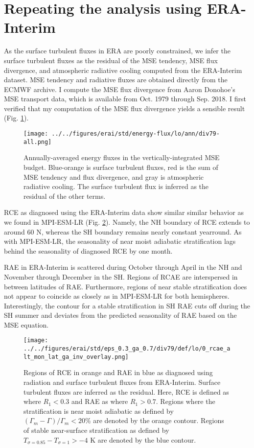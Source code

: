 \documentclass[11pt]{article}
\begin{document}
\section{Repeating the analysis using ERA-Interim}
\label{sec:orgb97cfc7}
As the surface turbulent fluxes in ERA are poorly constrained, we infer the surface turbulent fluxes as the residual of the MSE tendency, MSE flux divergence, and atmospheric radiative cooling computed from the ERA-Interim dataset. MSE tendency and radiative fluxes are obtained directly from the ECMWF archive. I compute the MSE flux divergence from Aaron Donohoe's MSE transport data, which is available from Oct. 1979 through Sep. 2018. I first verified that my computation of the MSE flux divergence yields a sensible result (Fig. \ref{fig:orgaa39c6c}).

\begin{figure}[htbp]
\centering
\texttt{[image: ../../figures/erai/std/energy-flux/lo/ann/div79-all.png]}
\caption{\label{fig:orgaa39c6c}Annually-averaged energy fluxes in the vertically-integrated MSE budget. Blue-orange is surface turbulent fluxes, red is the sum of MSE tendency and flux divergence, and gray is atmospheric radiative cooling. The surface turbulent flux is inferred as the residual of the other terms.}
\end{figure}

RCE as diagnosed using the ERA-Interim data show similar similar behavior as we found in MPI-ESM-LR (Fig. \ref{fig:orgf470bb8}). Namely, the NH boundary of RCE extends to around 60 N, whereas the SH boundary remains nearly constant yearround. As with MPI-ESM-LR, the seasonality of near moist adiabatic stratification lags behind the seasonality of diagnosed RCE by one month.

RAE in ERA-Interim is scattered during October through April in the NH and November through December in the SH. Regions of RCAE are interspersed in between latitudes of RAE. Furthermore, regions of near stable stratification does not appear to coincide as closely as in MPI-ESM-LR for both hemispheres. Interestingly, the contour for a stable stratification in SH RAE cuts off during the SH summer and deviates from the predicted seasonality of RAE based on the MSE equation.

\begin{figure}[htbp]
\centering
\texttt{[image: ../../figures/erai/std/eps\_0.3\_ga\_0.7/div79/def/lo/0\_rcae\_alt\_mon\_lat\_ga\_inv\_overlay.png]}
\caption{\label{fig:orgf470bb8}Regions of RCE in orange and RAE in blue as diagnosed using radiation and surface turbulent fluxes from ERA-Interim. Surface turbulent fluxes are inferred as the residual. Here, RCE is defined as where \(R_1 < 0.3\) and RAE as where \(R_1 > 0.7\). Regions where the stratification is near moist adiabatic as defined by \((\Gamma_m-\Gamma)/\Gamma_m<20\%\) are denoted by the orange contour. Regions of stable near-surface stratification as defined by \(T_{\sigma=0.85}-T_{\sigma=1}>-4\) K are denoted by the blue contour.}
\end{figure}
\end{document}
